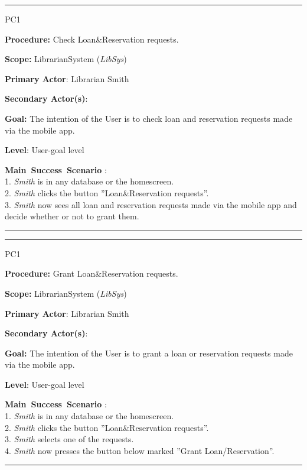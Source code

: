 \vspace{0.5cm}
\hrule
\begin{lyxlist}{PC1}
\small{
\item [\textbf{Procedure:}] Check Loan&Reservation requests.
\item [\textbf{Scope:}] LibrarianSystem (\emph{LibSys})
\item [\textbf{Primary Actor}:] Librarian Smith
\item [\textbf{Secondary Actor(s)}:] 
\item [\textbf{Goal:}] The intention of the User is to check loan and
reservation requests made via the mobile app.
\item [\textbf{Level}:] User-goal level
\item [\textbf{Main~Success~Scenario}]:\\
1. \emph{Smith} is in any database or the homescreen.\\
2. \emph{Smith} clicks the button ''Loan&Reservation requests''.\\
3. \emph{Smith} now sees all loan and reservation requests made via the
mobile app and decide whether or not to grant them.\\

}

\end{lyxlist}
\hrule


\vspace{0.5cm}
\hrule
\begin{lyxlist}{PC1}
\small{
\item [\textbf{Procedure:}] Grant Loan&Reservation requests.
\item [\textbf{Scope:}] LibrarianSystem (\emph{LibSys})
\item [\textbf{Primary Actor}:] Librarian Smith
\item [\textbf{Secondary Actor(s)}:] 
\item [\textbf{Goal:}] The intention of the User is to grant a loan or
reservation requests made via the mobile app.
\item [\textbf{Level}:] User-goal level
\item [\textbf{Main~Success~Scenario}]:\\
1. \emph{Smith} is in any database or the homescreen.\\
2. \emph{Smith} clicks the button ''Loan&Reservation requests''.\\
3. \emph{Smith} selects one of the requests.\\
4. \emph{Smith} now presses the button below marked ''Grant
Loan/Reservation''.\\

}

\end{lyxlist}
\hrule

